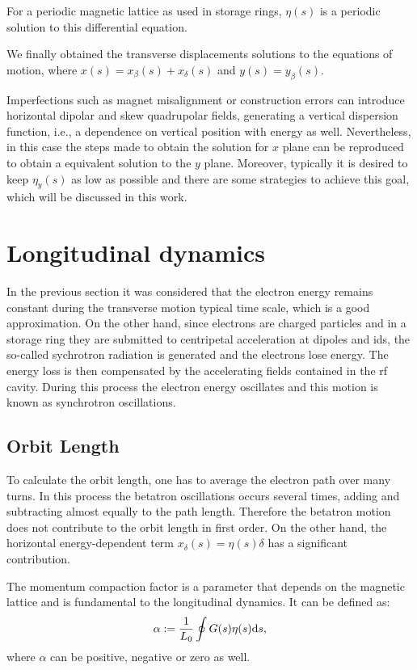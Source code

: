 For a periodic magnetic lattice as used in storage rings, $\eta(s)$ is a periodic solution to this differential equation.

We finally obtained the transverse displacements solutions to the equations of motion, where $x(s) = x_{\beta}(s) + x_{\delta} (s)$ and $y(s) = y_{\beta}(s)$. 

Imperfections such as magnet misalignment or construction errors can introduce horizontal dipolar and skew quadrupolar fields, generating a vertical dispersion function, i.e., a dependence on vertical position with energy as well. Nevertheless, in this case the steps made to obtain the solution for $x$ plane can be reproduced to obtain a equivalent solution to the $y$ plane. Moreover, typically it is desired to keep $\eta_y(s)$ as low as possible and there are some strategies to achieve this goal, which will be discussed in this work.
\section{Longitudinal dynamics}\label{longitudinal}
In the previous section it was considered that the electron energy remains constant during the transverse motion typical time scale, which is a good approximation. On the other hand, since electrons are charged particles and in a storage ring they are submitted to centripetal acceleration at dipoles and \gls{id}s, the so-called sychrotron radiation is generated and the electrons lose energy. The energy loss is then compensated by the accelerating fields contained in the \gls{rf} cavity. During this process the electron energy oscillates and this motion is known as synchrotron oscillations.
\subsection{Orbit Length}
To calculate the orbit length, one has to average the electron path over many turns. In this process the betatron oscillations occurs several times, adding and subtracting almost equally to the path length. Therefore the betatron motion does not contribute to the orbit length in first order. On the other hand, the horizontal energy-dependent term $x_{\delta}(s) = \eta(s) \delta$ has a significant contribution. 

The momentum compaction factor is a parameter that depends on the magnetic lattice and is fundamental to the longitudinal dynamics. It can be defined as:
\begin{equation}
    \alpha := \dfrac{1}{L_0}\oint G(s) \eta(s) \mathrm{d} s,
\end{equation}
where $\alpha$ can be positive, negative or zero as well. 

